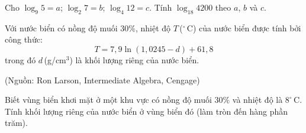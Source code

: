 \begin{bt}%

	Cho $\log_9 5=a$; $\log_2 7=b$; $\log_4 12=c$. Tính $\log_{18} 4200$ theo $a$, $b$ và $c$.
\end{bt}

\begin{bt}%

	Với nước biển có nồng độ muối $30\%$, nhiệt độ $T$\,($^{\circ}$\,C) của nước biển được tính bởi công thức:  
	\[T = 7{,}9 \ln(1{,}0245 - d) + 61{,}8\]
	trong đó $d$\,(g/cm$^3$) là khối lượng riêng của nước biển.  
	\begin{flushright}
		(Nguồn: Ron Larson, Intermediate Algebra, Cengage)  
	\end{flushright}
	Biết vùng biển khơi mặt ở một khu vực có nồng độ muối $30\%$ và nhiệt độ là $8^{\circ}\,\mathrm{C}$. Tính khối lượng riêng của nước biển ở vùng biển đó (làm tròn đến hàng phần trăm).
\end{bt}

